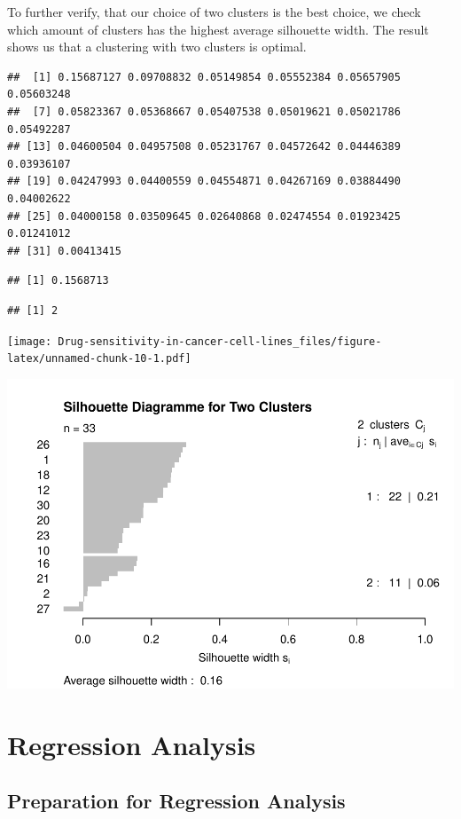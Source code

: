 \documentclass[
]{article}
\begin{document}
To further verify, that our choice of two clusters is the best choice,
we check which amount of clusters has the highest average silhouette
width. The result shows us that a clustering with two clusters is
optimal.

\begin{verbatim}
##  [1] 0.15687127 0.09708832 0.05149854 0.05552384 0.05657905 0.05603248
##  [7] 0.05823367 0.05368667 0.05407538 0.05019621 0.05021786 0.05492287
## [13] 0.04600504 0.04957508 0.05231767 0.04572642 0.04446389 0.03936107
## [19] 0.04247993 0.04400559 0.04554871 0.04267169 0.03884490 0.04002622
## [25] 0.04000158 0.03509645 0.02640868 0.02474554 0.01923425 0.01241012
## [31] 0.00413415
\end{verbatim}

\begin{verbatim}
## [1] 0.1568713
\end{verbatim}

\begin{verbatim}
## [1] 2
\end{verbatim}

\texttt{[image: Drug-sensitivity-in-cancer-cell-lines\_files/figure-latex/unnamed-chunk-10-1.pdf]}

\includegraphics{Drug-sensitivity-in-cancer-cell-lines_files/figure-latex/unnamed-chunk-11-1.pdf}

\hypertarget{regression-analysis}{%
\section{Regression Analysis}\label{regression-analysis}}

\hypertarget{preparation-for-regression-analysis}{%
\subsection{Preparation for Regression
Analysis}\label{preparation-for-regression-analysis}}
\end{document}
